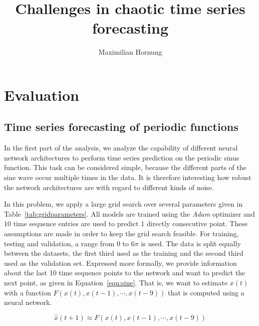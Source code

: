 \documentclass{article}
\title{Challenges in chaotic time series forecasting}
\author{Maximilian Hornung}
\begin{document}
\maketitle





\section{Evaluation}
\subsection{Time series forecasting of periodic functions}
\label{sec:sine}
In the first part of the analysis, we analyze the capability of different neural
network architectures to perform time series prediction on the periodic sinus
function. This task can be considered simple, because the different parts of the
sine wave occur multiple times in the data.
It is therefore interesting how
robust the network architectures are with regard to different kinds of noise.

In this problem, we apply a large grid search over several parameters given in
Table~\ref{tab:gridparameters}. All models are trained using the \emph{Adam}
optimizer and $10$ time sequence entries are used to predict $1$ directly
consecutive point. These assumptions are made in order to keep the grid search
feasible. For training, testing and validation, a range from $0$ to $6 \pi$ is
used. The data is split equally between the datasets, the first third used as 
the training and the second third used as the validation set.
Expressed more formally,
we provide information about the last 10 time sequence points
to the network and want to predict the next point, as given in
Equation~\ref{equ:sine}. That is, we want to estimate $x(t)$ with a function
$F(x(t), x(t-1), \cdots, x(t-9))$ that is computed using a neural network.

\begin{equation}
    \hat{x} (t + 1) \approx F(x(t), x(t-1), \cdots, x(t-9))
    \label{equ:sine}
\end{equation}
\end{document}
